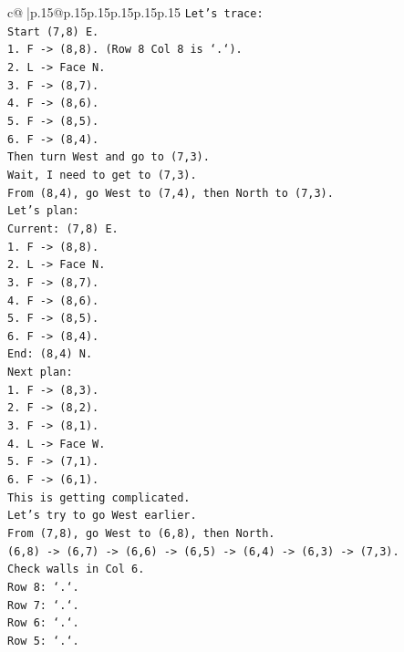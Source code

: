 \documentclass{article}
\begin{document}
{\begin{supertabular}{c@{$\;$}|p{.15\linewidth}@{}p{.15\linewidth}p{.15\linewidth}p{.15\linewidth}p{.15\linewidth}p{.15\linewidth}}
{{{\texttt{Let's trace:} \\
\texttt{Start (7,8) E.} \\
\texttt{1. F {-}> (8,8). (Row 8 Col 8 is `.`).} \\
\texttt{2. L {-}> Face N.} \\
\texttt{3. F {-}> (8,7).} \\
\texttt{4. F {-}> (8,6).} \\
\texttt{5. F {-}> (8,5).} \\
\texttt{6. F {-}> (8,4).} \\
\texttt{Then turn West and go to (7,3).} \\
\texttt{Wait, I need to get to (7,3).} \\
\texttt{From (8,4), go West to (7,4), then North to (7,3).} \\
\texttt{Let's plan:} \\
\texttt{Current: (7,8) E.} \\
\texttt{1. F {-}> (8,8).} \\
\texttt{2. L {-}> Face N.} \\
\texttt{3. F {-}> (8,7).} \\
\texttt{4. F {-}> (8,6).} \\
\texttt{5. F {-}> (8,5).} \\
\texttt{6. F {-}> (8,4).} \\
\texttt{End: (8,4) N.} \\
\texttt{Next plan:} \\
\texttt{1. F {-}> (8,3).} \\
\texttt{2. F {-}> (8,2).} \\
\texttt{3. F {-}> (8,1).} \\
\texttt{4. L {-}> Face W.} \\
\texttt{5. F {-}> (7,1).} \\
\texttt{6. F {-}> (6,1).} \\
\texttt{This is getting complicated.} \\
\texttt{Let's try to go West earlier.} \\
\texttt{From (7,8), go West to (6,8), then North.} \\
\texttt{(6,8) {-}> (6,7) {-}> (6,6) {-}> (6,5) {-}> (6,4) {-}> (6,3) {-}> (7,3).} \\
\texttt{Check walls in Col 6.} \\
\texttt{Row 8: `.`.} \\
\texttt{Row 7: `.`.} \\
\texttt{Row 6: `.`.} \\
\texttt{Row 5: `.`.} \\
}}}
\end{supertabular}}
\end{document}
